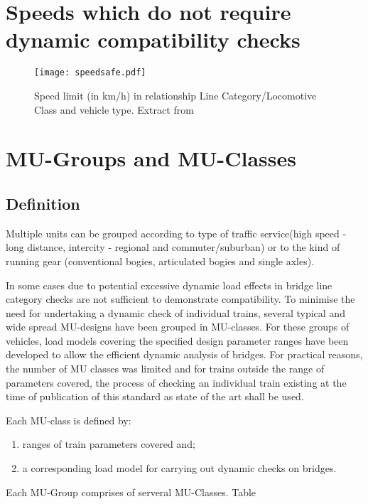 \begin{appendices}
\chapter{Speeds which do not require dynamic compatibility checks} \label{app:speedsafe}

\begin{figure}[h]
    \centering
    \texttt{[image: speedsafe.pdf]}
    \caption{Speed limit (in km/h) in relationship Line Category/Locomotive Class and vehicle type. Extract from \cite[Appendix F]{EC15528}}
\end{figure}

\chapter{MU-Groups and MU-Classes}\label{app:mu}

\section{Definition}
Multiple units can be grouped according to type of traffic service(high speed - long distance, intercity - regional and commuter/suburban) or to the kind of running gear (conventional bogies, articulated bogies and single axles).


In some cases due to potential excessive dynamic load effects in bridge line category checks are not sufficient to demonstrate compatibility. To minimise the need for undertaking a dynamic check of individual trains, several typical and wide spread MU-designs have been grouped in MU-classes. For these groups of vehicles, load models covering the specified design parameter ranges have been developed to allow the efficient dynamic analysis of bridges. For practical reasons, the number of MU classes was limited and for trains outside the range of parameters covered, the process of checking an individual train existing at the time of publication of this standard as state of the art shall be used.

Each MU-class is defined by:

\begin{enumerate}[-]
\item ranges of train parameters covered and;
\item a corresponding load model for carrying out dynamic checks on bridges.
\end{enumerate}

Each MU-Group comprises of serveral MU-Classes. Table


\end{appendices}
